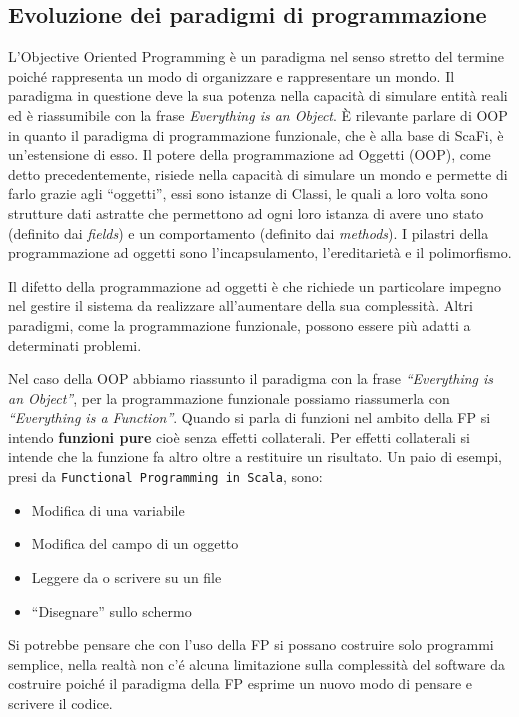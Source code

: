 \documentclass[12pt,a4paper,openright,twoside]{book}
\begin{document}
\subsection{Evoluzione dei paradigmi di programmazione}

L'Objective Oriented Programming è un paradigma nel senso stretto del termine poiché rappresenta un modo di organizzare e rappresentare un mondo. 
Il paradigma in questione deve la sua potenza nella capacità di simulare entità reali ed è riassumibile con la frase \textit{Everything is an Object}. 
È rilevante parlare di OOP in quanto il paradigma di programmazione funzionale, che è alla base di ScaFi, è un'estensione di esso. 
Il potere della programmazione ad Oggetti (OOP), come detto precedentemente, risiede nella capacità di simulare un mondo e permette di farlo grazie agli ``oggetti'', essi sono istanze di Classi, le quali a loro volta sono strutture dati astratte che permettono ad ogni loro istanza di avere uno stato (definito dai \textit{fields}) e un comportamento (definito dai \textit{methods}).
I pilastri della programmazione ad oggetti sono l'incapsulamento, l'ereditarietà e il polimorfismo.

Il difetto della programmazione ad oggetti è che richiede un particolare impegno nel gestire il sistema da realizzare all'aumentare della sua complessità. Altri paradigmi, come la programmazione funzionale, possono essere più adatti a determinati problemi.

Nel caso della OOP abbiamo riassunto il paradigma con la frase \textit{``Everything is an Object''}, per la programmazione funzionale possiamo riassumerla con \textit{``Everything is a Function''}. Quando si parla di funzioni nel ambito della \ac{FP} si intendo \textbf{funzioni pure}\cite{Hunt2018} cioè senza effetti collaterali. Per effetti collaterali si intende che la funzione fa altro oltre a restituire un risultato. Un paio di esempi, presi da \texttt{Functional Programming in Scala}, sono:

\begin{itemize}
    \item Modifica di una variabile
    \item Modifica del campo di un oggetto
    \item Leggere da o scrivere su un file
    \item ``Disegnare'' sullo schermo
\end{itemize}

Si potrebbe pensare che con l'uso della \ac{FP} si possano costruire solo programmi semplice, nella realtà non c'é alcuna limitazione sulla complessità del software da costruire poiché il paradigma della FP esprime un nuovo modo di pensare e scrivere il codice.
\end{document}
